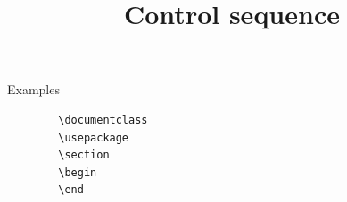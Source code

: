 \documentclass[a4paper]{article}
\title{Control sequence}
\date{}
\begin{document}
    \maketitle
    Examples
    \begin{verbatim}
        \documentclass
        \usepackage
        \section
        \begin
        \end
    \end{verbatim}
\end{document}
